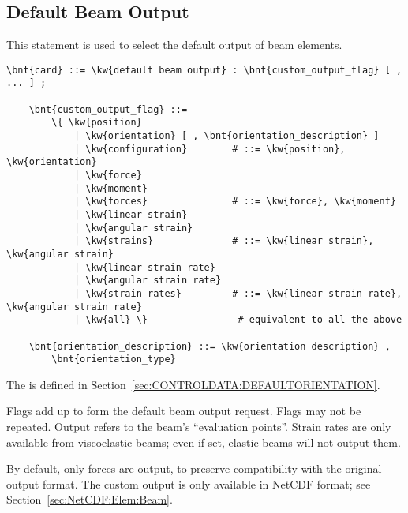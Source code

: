 \subsection{Default Beam Output}\label{sec:CONTROLDATA:DEFAULTBEAMOUTPUT}
This statement is used to select the default output of beam elements.
\begin{Verbatim}[commandchars=\\\{\}]
    \bnt{card} ::= \kw{default beam output} : \bnt{custom_output_flag} [ , ... ] ;

    \bnt{custom_output_flag} ::=
        \{ \kw{position}
            | \kw{orientation} [ , \bnt{orientation_description} ]
            | \kw{configuration}        # ::= \kw{position}, \kw{orientation}
            | \kw{force}
            | \kw{moment}
            | \kw{forces}               # ::= \kw{force}, \kw{moment}
            | \kw{linear strain}
            | \kw{angular strain}
            | \kw{strains}              # ::= \kw{linear strain}, \kw{angular strain}
            | \kw{linear strain rate}
            | \kw{angular strain rate}
            | \kw{strain rates}         # ::= \kw{linear strain rate}, \kw{angular strain rate}
            | \kw{all} \}                # equivalent to all the above

    \bnt{orientation_description} ::= \kw{orientation description} ,
        \bnt{orientation_type}
\end{Verbatim}
The  is defined
in Section~\ref{sec:CONTROLDATA:DEFAULTORIENTATION}.

Flags add up to form the default beam output request.
Flags may not be repeated.
Output refers to the beam's ``evaluation points''.
Strain rates are only available from viscoelastic beams;
even if set, elastic beams will not output them.

By default, only forces are output, to preserve compatibility
with the original output format.
The custom output is only available in NetCDF format;
see Section~\ref{sec:NetCDF:Elem:Beam}.



